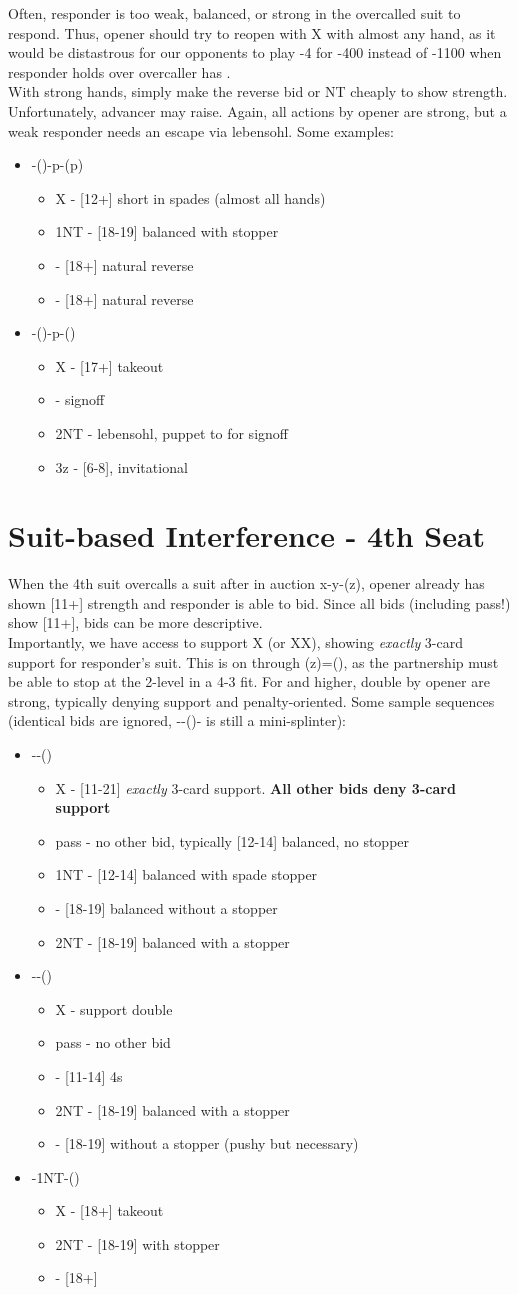 \documentclass[12pt]{report}
\newcommand{\n}{\\}
\newcommand{\q}[1]{\multido{}{#1}{\qquad}}
\newcommand{\ul}[1]{\begin{itemize}#1\end{itemize}}
\newcommand{\li}[1]{\item[~] \q{#1}}
\begin{document}
    Often, responder is too weak, balanced, or strong in the overcalled suit to respond.  Thus, opener should try to reopen with X with almost any hand, as it would be distastrous for our opponents to play -4 for -400 instead of -1100 when responder holds  over overcaller has . \n
    
    With strong hands, simply make the reverse bid or NT cheaply to show strength.  Unfortunately, advancer may raise.  Again, all actions by opener are strong, but a weak responder needs an escape via lebensohl.  Some examples:

    \ul{
        \li0 -()-p-(p) \ul{
            \li0 X - [12+] short in spades (almost all hands)
            \li0 1NT - [18-19] balanced with stopper
            \li0 \di2 - [18+] natural reverse
            \li0 \he2 - [18+] natural reverse
        }

        \li0 \di1-(\he1)-p-(\he2) \ul{
            \li0 X - [17+] takeout
                \li1 \sp2 - signoff
                \li1 2NT - lebensohl, puppet to \cl3 for signoff
                \li1 3z - [6-8], invitational
        }
    }
\section{Suit-based Interference - 4th Seat} \label{3:3}

    When the 4th suit overcalls a suit after in auction x-y-(z), opener already has shown [11+] strength and responder is able to bid.  Since all bids (including pass!) show [11+], bids can be more descriptive.\n

    Importantly, we have access to support X (or XX), showing \textit{exactly} 3-card support for responder's suit.  This is on through (z)=(), as the partnership must be able to stop at the 2-level in a 4-3 fit.  For  and higher, double by opener are strong, typically denying support and penalty-oriented.  Some sample sequences (identical bids are ignored, --()- is still a mini-splinter):

    \ul{
        \li0 --() \ul{
            \li0 X - [11-21] \textit{exactly} 3-card support.  \textbf{All other bids deny 3-card support}
            \li0 pass - no other bid, typically [12-14] balanced, no stopper
            \li0 1NT - [12-14] balanced with spade stopper
            \li0 \sp2 - [18-19] balanced without a stopper
            \li0 2NT - [18-19] balanced with a stopper
        }

        \li0 \di1-\sp1-(\he2) \ul{
            \li0 X - support double
            \li0 pass - no other bid
            \li0 \sp2 - [11-14] 4\sp{}s
            \li0 2NT - [18-19] balanced with a stopper
            \li0 \he3 - [18-19] without a stopper (pushy but necessary)
        }

        \li0 \he1-1NT-(\sp2) \ul{
            \li0 X - [18+] takeout
            \li0 2NT - [18-19] with stopper
            \li0 \cl3 - [18+]
        }
    }
\end{document}
